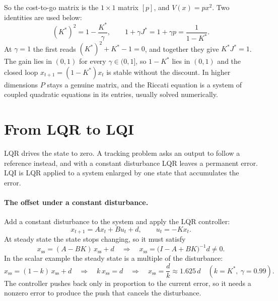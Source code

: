 \documentclass[11pt]{article}
\begin{document}
So the cost-to-go matrix is the $1 \times 1$ matrix $[p]$, and $V(x) = p x^2$. Two identities are used
below:
\[
  (K^*)^2 = 1 - \frac{K^*}{\gamma}, \qquad 1 + \gamma J^* = 1 + \gamma p = \frac{1}{1 - K^*} .
\]
At $\gamma = 1$ the first reads $(K^*)^2 + K^* - 1 = 0$, and together they give $K^* J^* = 1$. The
gain lies in $(0, 1)$ for every $\gamma \in (0, 1]$, so $1 - K^*$ lies in $(0, 1)$ and the closed loop
$x_{t+1} = (1 - K^*)x_t$ is stable without the discount. In higher dimensions $P$ stays a genuine
matrix, and the Riccati equation is a system of coupled quadratic equations in its entries, usually
solved numerically.

\section{From LQR to LQI}
\label{sec:lqi}

LQR drives the state to zero. A tracking problem asks an output to follow a reference instead, and
with a constant disturbance LQR leaves a permanent error. LQI is LQR applied to a system enlarged by
one state that accumulates the error.

\paragraph{The offset under a constant disturbance.} Add a constant disturbance to the system and
apply the LQR controller:
\[
  x_{t+1} = A x_t + B u_t + d, \qquad u_t = -K x_t .
\]
At steady state the state stops changing, so it must satisfy
\[
  x_{\mathrm{ss}} = (A - B K)\, x_{\mathrm{ss}} + d
  \quad\Longrightarrow\quad
  x_{\mathrm{ss}} = \big(I - A + B K\big)^{-1} d \neq 0 .
\]
In the scalar example the steady state is a multiple of the disturbance:
\[
  x_{\mathrm{ss}} = (1 - k)\, x_{\mathrm{ss}} + d
  \quad\Longrightarrow\quad k\, x_{\mathrm{ss}} = d
  \quad\Longrightarrow\quad x_{\mathrm{ss}} = \frac{d}{k} \approx 1.625\, d
  \quad (k = K^*,\ \gamma = 0.99).
\]
The controller pushes back only in proportion to the current error, so it needs a nonzero error to
produce the push that cancels the disturbance.
\end{document}
